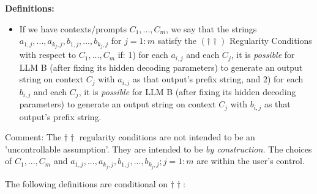 \documentclass{article}
\begin{document}
\textbf{Definitions:}
\begin{itemize}
\item If we have contexts/prompts $\displaystyle C_{1} ,...,C_{m}$, we say that the strings $\displaystyle a_{1,j} ,...,a_{k_{j} ,j} ,b_{1,j} ,...,b_{k_{j} ,j}$ for $\displaystyle j=1:m$ satisfy the $\displaystyle \left( \dagger \dagger \right)$ Regularity Conditions with respect to $\displaystyle C_{1} ,...,C_{m}$ if: 1) for each $\displaystyle a_{i,j}$ and each $\displaystyle C_{j}$, it is \textit{possible} for LLM B (after fixing its hidden decoding parameters) to generate an output string on context $\displaystyle C_{j}$ with $\displaystyle a_{i,j}$ as that output's prefix string, and 2) for each $\displaystyle b_{i,j}$ and each $\displaystyle C_{j}$, it is \textit{possible} for LLM B (after fixing its hidden decoding parameters) to generate an output string on context $\displaystyle C_{j}$ with $\displaystyle b_{i,j}$ as that output's prefix string.
\end{itemize}

Comment: The $\displaystyle \dagger \dagger $ regularity conditions are not intended to be an 'uncontrollable assumption'. They are intended to be \textit{by construction.} The choices of $\displaystyle C_{1} ,...,C_{m}$ and $\displaystyle a_{1,j} ,...,a_{k_{j} ,j} ,b_{1,j} ,...,b_{k_{j} ,j} ;j=1:m$ are within the user's control.


The following definitions are conditional on $\displaystyle \dagger \dagger $:
\end{document}
